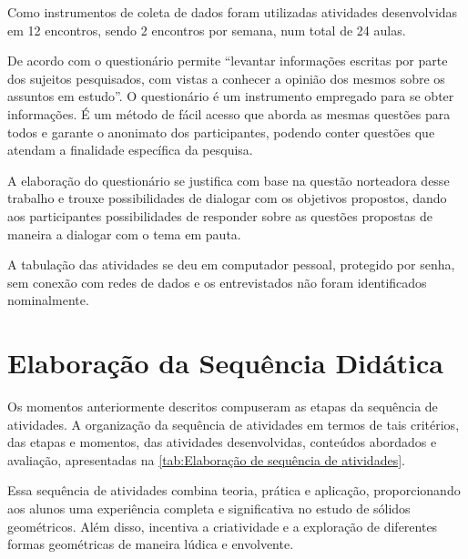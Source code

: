 Como instrumentos de coleta de dados foram utilizadas atividades desenvolvidas em 12 encontros, sendo 2 encontros por semana, num total de 24 aulas.

De acordo com  o questionário permite ``levantar
informações escritas por parte dos sujeitos pesquisados, com vistas a conhecer a opinião dos mesmos sobre os assuntos em estudo''. O questionário é um instrumento empregado para se obter informações. É um método de fácil acesso que aborda as mesmas questões para todos e garante o anonimato dos participantes, podendo conter questões que atendam a finalidade específica da pesquisa.

A elaboração do questionário se justifica com base na questão norteadora desse trabalho e trouxe possibilidades de dialogar com os objetivos propostos, dando aos participantes possibilidades de responder sobre as questões propostas de maneira a dialogar com o tema em pauta.

A tabulação das atividades se deu em computador pessoal, protegido por senha, sem conexão com redes de dados e os entrevistados não foram identificados nominalmente.

\section{Elaboração da Sequência Didática}

Os momentos anteriormente descritos compuseram as etapas da sequência de atividades. A organização da sequência de atividades em termos de tais critérios, das etapas e momentos, das atividades desenvolvidas, conteúdos abordados e avaliação, apresentadas na \autoref{tab:Elaboração de sequência de atividades}.

Essa sequência de atividades combina teoria, prática e aplicação, proporcionando aos alunos uma experiência completa e significativa no estudo de sólidos geométricos. Além disso, incentiva a criatividade e a exploração de diferentes formas geométricas de maneira lúdica e envolvente.

